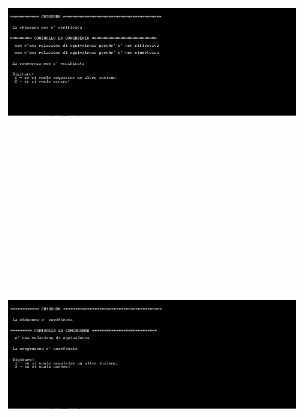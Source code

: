﻿\documentclass[11pt, a4paper, titlepage, block]{article}
\begin{document}
\includegraphics[width=3in,height=3in,viewport=0 0 300 300]{../Screenshots/Capture6.JPG}
\includegraphics[width=3in,height=3in,viewport=0 0 300 300]{../Screenshots/Capture7.JPG}	
\end{document}
